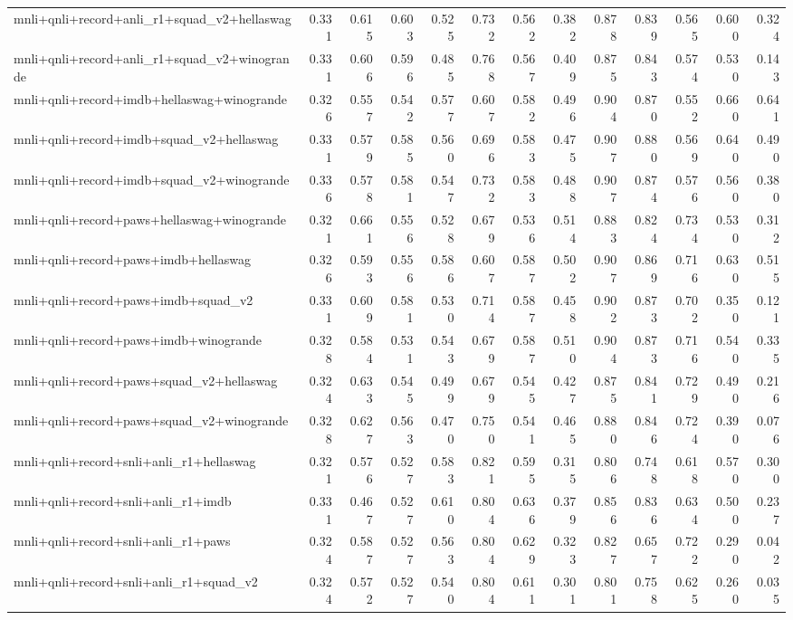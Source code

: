 \begin{table}[t]
\begin{tabular}{lrrrrrrrrrrrr}
    mnli+qnli+record+anli\_r1+squad\_v2+hellaswag & 0.331 & 0.615 & 0.603 & 0.525 & 0.732 & 0.562 & 0.382 & 0.878 & 0.839 & 0.565 & 0.600 & 0.324 \\
    mnli+qnli+record+anli\_r1+squad\_v2+winogrande & 0.331 & 0.606 & 0.596 & 0.485 & 0.768 & 0.567 & 0.409 & 0.875 & 0.843 & 0.574 & 0.530 & 0.143 \\
    mnli+qnli+record+imdb+hellaswag+winogrande & 0.326 & 0.557 & 0.542 & 0.577 & 0.607 & 0.582 & 0.496 & 0.904 & 0.870 & 0.552 & 0.660 & 0.641 \\
    mnli+qnli+record+imdb+squad\_v2+hellaswag & 0.331 & 0.579 & 0.585 & 0.560 & 0.696 & 0.583 & 0.475 & 0.907 & 0.880 & 0.569 & 0.640 & 0.490 \\
    mnli+qnli+record+imdb+squad\_v2+winogrande & 0.336 & 0.578 & 0.581 & 0.547 & 0.732 & 0.583 & 0.488 & 0.907 & 0.874 & 0.576 & 0.560 & 0.380 \\
    mnli+qnli+record+paws+hellaswag+winogrande & 0.321 & 0.661 & 0.556 & 0.528 & 0.679 & 0.536 & 0.514 & 0.883 & 0.824 & 0.734 & 0.530 & 0.312 \\
    mnli+qnli+record+paws+imdb+hellaswag & 0.326 & 0.593 & 0.556 & 0.586 & 0.607 & 0.587 & 0.502 & 0.907 & 0.869 & 0.716 & 0.630 & 0.515 \\
    mnli+qnli+record+paws+imdb+squad\_v2 & 0.331 & 0.609 & 0.581 & 0.530 & 0.714 & 0.587 & 0.458 & 0.902 & 0.873 & 0.702 & 0.350 & 0.121 \\
    mnli+qnli+record+paws+imdb+winogrande & 0.328 & 0.584 & 0.531 & 0.543 & 0.679 & 0.587 & 0.510 & 0.904 & 0.873 & 0.716 & 0.540 & 0.335 \\
    mnli+qnli+record+paws+squad\_v2+hellaswag & 0.324 & 0.633 & 0.545 & 0.499 & 0.679 & 0.545 & 0.427 & 0.875 & 0.841 & 0.729 & 0.490 & 0.216 \\
    mnli+qnli+record+paws+squad\_v2+winogrande & 0.328 & 0.627 & 0.563 & 0.470 & 0.750 & 0.541 & 0.465 & 0.880 & 0.846 & 0.724 & 0.390 & 0.076 \\
    mnli+qnli+record+snli+anli\_r1+hellaswag & 0.321 & 0.576 & 0.527 & 0.583 & 0.821 & 0.595 & 0.315 & 0.806 & 0.748 & 0.618 & 0.570 & 0.300 \\
    mnli+qnli+record+snli+anli\_r1+imdb & 0.331 & 0.467 & 0.527 & 0.610 & 0.804 & 0.636 & 0.379 & 0.856 & 0.836 & 0.634 & 0.500 & 0.237 \\
    mnli+qnli+record+snli+anli\_r1+paws & 0.324 & 0.587 & 0.527 & 0.563 & 0.804 & 0.629 & 0.323 & 0.827 & 0.657 & 0.722 & 0.290 & 0.042 \\
    mnli+qnli+record+snli+anli\_r1+squad\_v2 & 0.324 & 0.572 & 0.527 & 0.540 & 0.804 & 0.611 & 0.301 & 0.801 & 0.758 & 0.625 & 0.260 & 0.035 \\

\end{tabular}
\end{table}
